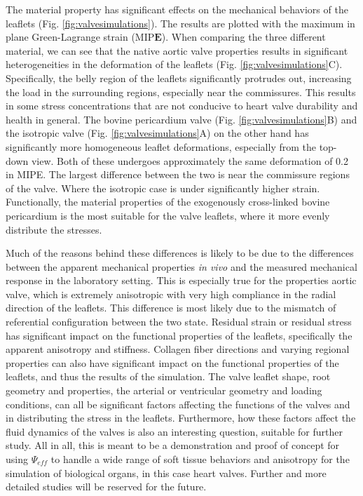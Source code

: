     The material property has significant effects on the mechanical behaviors of the leaflets (Fig. \ref{fig:valvesimulations}). The results are plotted with the maximum in plane Green-Lagrange strain (MIP$\mathbf{E}$). When comparing the three different material, we can see that the native aortic valve properties results in significant heterogeneities in the deformation of the leaflets (Fig. \ref{fig:valvesimulations}C). Specifically, the belly region of the leaflets significantly protrudes out, increasing the load in the surrounding regions, especially near the commissures. This results in some stress concentrations that are not conducive to heart valve durability and health in general. The bovine pericardium valve (Fig. \ref{fig:valvesimulations}B) and the isotropic valve (Fig. \ref{fig:valvesimulations}A) on the other hand has significantly more homogeneous leaflet deformations, especially from the top-down view. Both of these undergoes approximately the same deformation of 0.2 in MIPE. The largest difference between the two is near the commissure regions of the valve. Where the isotropic case is under significantly higher strain. Functionally, the material properties of the exogenously cross-linked bovine pericardium is the most suitable for the valve leaflets, where it more evenly distribute the stresses. 
    
    Much of the reasons behind these differences is likely to be due to the differences between the apparent mechanical properties \textit{in vivo} and the measured mechanical response in the laboratory setting. This is especially true for the properties aortic valve, which is extremely anisotropic with very high compliance in the radial direction of the leaflets. This difference is most likely due to the mismatch of referential configuration between the two state. Residual strain or residual stress has significant impact on the functional properties of the leaflets, specifically the apparent anisotropy and stiffness. Collagen fiber directions and varying regional properties can also have significant impact on the functional properties of the leaflets, and thus the results of the simulation. The valve leaflet shape, root geometry and properties, the arterial or ventricular geometry and loading conditions, can all be significant factors affecting the functions of the valves and in distributing the stress in the leaflets. Furthermore, how these factors affect the fluid dynamics of the valves is also an interesting question, suitable for further study. All in all, this is meant to be a demonstration and proof of concept for using $\Psi_{eff}$ to handle a wide range of soft tissue behaviors and anisotropy for the simulation of biological organs, in this case heart valves. Further and more detailed studies will be reserved for the future.  
  
